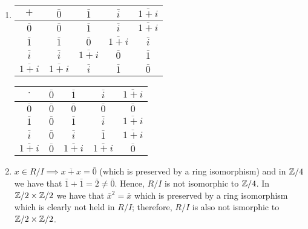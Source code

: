 \begin{solution}
\begin{enumerate}
        \item
            \begin{center}
                \begin{tabular}{ccccc}
                    \toprule
                    $+$ & $\bar 0$ & $\bar 1$ & $\bar i$ & $\overline{1 + i}$ \\
                    \midrule
                    $\overline 0$ & $\overline 0$ & $\overline 1$ & $\overline i$ & $\overline{1 + i}$ \\
                    $\overline{1}$ & $\overline{1}$ & $\overline{0}$ & $\overline{1 + i}$ & $\overline{i}$ \\
                    $\overline{i}$ & $\overline{i}$ & $\overline{1 + i}$ & $\overline{0}$ & $\overline{1}$ \\
                    $\overline{1 + i}$ & $\overline{1 + i}$ & $\overline{i}$ & $\overline{1}$ & $\overline{0}$ \\
                    \bottomrule
                \end{tabular}
                \begin{tabular}{ccccc}
                    \toprule
                    $\cdot$ & $\overline{0}$ & $\overline{1}$ & $\overline{i}$ & $\overline{1 + i}$ \\
                    \midrule
                    $\overline{0}$ & $\overline{0}$ & $\overline{0}$ & $\overline{0}$ & $\overline{0}$ \\
                    $\overline{1}$ & $\overline{0}$ & $\overline{1}$ & $\overline{i}$ & $\overline{1 + i}$ \\
                    $\overline{i}$ & $\overline{0}$ & $\overline{i}$ & $\overline{1}$ & $\overline{1 + i}$ \\
                    $\overline{1 + i}$ & $\overline{0}$ & $\overline{1 + i}$ & $\overline{1 + i}$ & $\overline{0}$ \\
                    \bottomrule
                \end{tabular}
            \end{center}

        \item $x \in R/I \implies \overline{x + x} = \overline{0}$
            (which is preserved by a ring isomorphism)
            and in $\mathbb{Z}/4$ we have that $\bar 1 + \bar 1 = \bar 2 \neq \bar 0$.
            Hence, $R/I$ is not isomorphic to $\mathbb{Z}/4$.
            In $\mathbb{Z}/2 \times \mathbb{Z}/2$ we have that $\overline x^2 = \overline x$
            which is preserved by a ring isomorphism which is clearly not
            held in $R/I$; therefore, 
            $R/I$ is also not ismorphic to $\mathbb{Z}/2 \times \mathbb{Z}/2$.
    \end{enumerate}
\end{solution}
